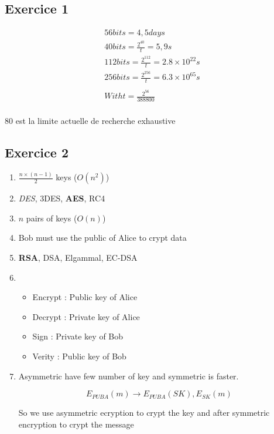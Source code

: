 \subsection{Exercice 1}
\begin{eqnarray*}
    56 bits = 4,5 days \\
    40 bits = \frac{2^{40}}{t} = 5,9 s \\
    112 bits = \frac{2^{112}}{t} = 2.8 \times 10^{22} s \\
    256 bits = \frac{2^{256}}{t} = 6.3 \times 10^{65} s \\
    \\
    With t = \frac{2^{56}}{388 800} \\
\end{eqnarray*}

80 est la limite actuelle de recherche exhaustive

\subsection{Exercice 2}
\begin{enumerate}
    \item $\frac{n\times (n-1)}{2}$ keys   ($O(n^2)$)
    \item \textit{DES}, 3DES, \textbf{AES}, RC4

    \item $n$ pairs of keys  ($O(n)$)
    \item Bob must use the public of Alice to crypt data
    \item \textbf{RSA}, DSA, Elgammal, EC-DSA

    \item
      \begin{itemize}
        \item Encrypt : Public key of Alice
        \item Decrypt : Private key of Alice
        \item Sign    : Private key of Bob
        \item Verity  : Public key of Bob
      \end{itemize}

    \item Asymmetric have few number of key and symmetric is faster.

        $$E_{PUB A}(m) \to E_{PUB A}(SK), E_{SK}(m)$$

        So we use asymmetric ecryption to crypt the key and after
        symmetric encryption to crypt the message
\end{enumerate}


